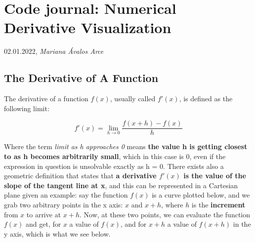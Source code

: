 \documentclass[12pt]{article}
\date{}
\begin{document}

 

\section*{\textbf{Code journal: Numerical Derivative Visualization}}

02.01.2022, \textit{Mariana Ávalos Arce}

\subsection*{The Derivative of A Function}

The derivative of a function $f(x)$, usually called $f'(x)$, is defined as the following limit:

\begin{equation}
    f'(x) = \lim_{h\to0} \frac{f(x+h) - f(x)}{h}
\end{equation}

Where the term \textit{limit as h approaches 0} means \textbf{the value h is getting closest to as h becomes arbitrarily small}, which in this case is 0, even if the expression in question is unsolvable exactly as h = 0. There exists also a geometric definition that states that \textbf{a derivative $f'(x)$ is the value of the slope of the tangent line at x}, and this can be represented in a Cartesian plane given an example: say the function $f(x)$ is a curve plotted below, and we grab two arbitrary points in the x axis: $x$ and $x+h$, where $h$ is the \textbf{increment} from $x$ to arrive at $x+h$. Now, at these two points, we can evaluate the function $f(x)$ and get, for $x$ a value of $f(x)$, and for $x+h$ a value of $f(x+h)$ in the y axis, which is what we see below.
\end{document}
